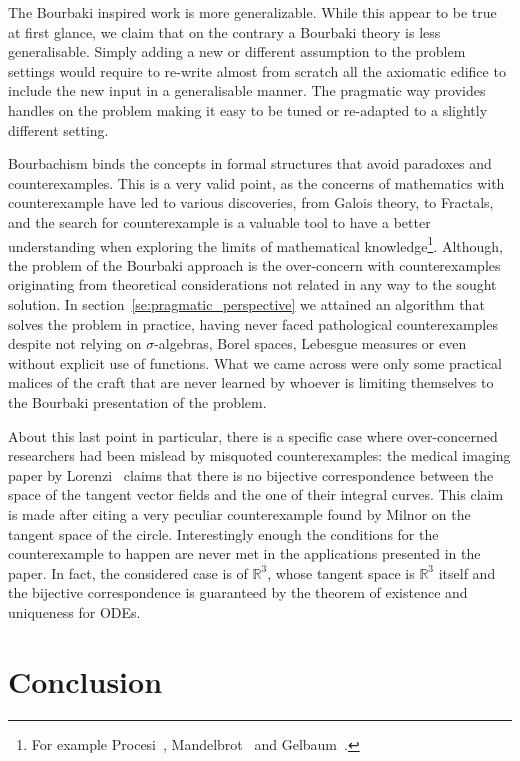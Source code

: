 \documentclass[]{scrartcl}
\theoremstyle{definition}
\begin{document}
The Bourbaki inspired work is more generalizable. While this appear to be true at first glance, we claim that on the contrary a Bourbaki theory is less generalisable. Simply adding a new or different assumption to the problem settings would require to re-write almost from scratch all the axiomatic edifice to include the new input in a generalisable manner. The pragmatic way provides handles on the problem making it easy to be tuned or re-adapted to a slightly different setting. 

Bourbachism binds the concepts in formal structures that avoid paradoxes and counterexamples. This is a very valid point, as the concerns of mathematics with counterexample have led to various discoveries, from Galois theory, to Fractals, and the search for counterexample is a valuable tool to have a better understanding when exploring the limits of mathematical knowledge\footnote{
    For example Procesi~\cite{procesi1977elementi}, Mandelbrot~\cite{mandelbrot1983fractal} and Gelbaum~\cite{gelbaum2003counterexamples}.
}. Although, the problem of the Bourbaki approach is the over-concern with counterexamples originating from theoretical considerations not related in any way to the sought solution. In section~\ref{se:pragmatic_perspective} we attained an algorithm that solves the problem in practice, having never faced pathological counterexamples despite not relying on $\sigma$-algebras, Borel spaces, Lebesgue measures or even without explicit use of functions. What we came across were only some practical malices of the craft that are never learned by whoever is limiting themselves to the Bourbaki presentation of the problem.

About this last point in particular, there is a specific case where over-concerned researchers had been mislead by misquoted counterexamples: the medical imaging paper by Lorenzi~\cite{lorenzi2013geodesics} claims that there is no bijective correspondence between the space of the tangent vector fields and the one of their integral curves. This claim is made after citing a very peculiar counterexample found by Milnor on the tangent space of the circle.
Interestingly enough the conditions for the counterexample to happen are never met in the applications presented in the paper. In fact, the considered case is of $\mathbb{R}^3$, whose tangent space is $\mathbb{R}^3$ itself and the bijective correspondence is guaranteed by the theorem of existence and uniqueness for ODEs.


\section{Conclusion}
\end{document}
